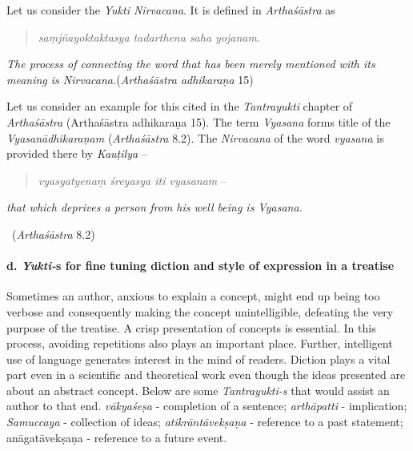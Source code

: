 Let us consider the \textit{Yukti Nirvacana}. It is defined in \textit{Arthaśāstra} as

\begin{quote}
\textit{saṃjñayoktaktasya tadarthena saha yojanam}.
\end{quote}

\begin{myquote}
\textit{The process of connecting the word that has been merely mentioned with its meaning is Nirvacana.}\hfill (\textit{Arthaśāstra adhikaraṇa} 15)
\end{myquote}

Let us consider an example for this cited in the \textit{Tantrayukti} chapter of \textit{Arthaśāstra} (Arthaśāstra adhikaraṇa 15). The term \textit{Vyasana} forms title of the \textit{Vyasanādhikaraṇam} (\textit{Arthaśāstra} 8.2). The \textit{Nirvacana} of the word \textit{vyasana} is provided there by \textit{Kauṭilya} –

\begin{verse}
\textit{vyasyatyenaṃ śreyasya iti vyasanam} –
\end{verse}

\begin{myquote}
\textit{that which deprives a person from his well being is Vyasana.}

~\hfill (\textit{Arthaśāstra} 8.2)
\end{myquote}


\paragraph*{d. \textit{Yukti-}s for fine tuning diction and style of expression in a treatise}

Sometimes an author, anxious to explain a concept, might end up being too verbose and consequently making the concept unintelligible, defeating the very purpose of the treatise. A crisp presentation of concepts is essential. In this process, avoiding repetitions also plays an important place. Further, intelligent use of language generates interest in the mind of readers. Diction plays a vital part even in a scientific and theoretical work even though the ideas presented are about an abstract concept. Below are some \textit{Tantrayukti-s} that would assist an author to that end. \textit{vākyaśeṣa} - completion of a sentence; \textit{arthāpatti} - implication; \textit{Samuccaya} - collection of ideas; \textit{atikrāntāvekṣaṇa} - reference to a past statement; anāgatāvekṣaṇa - reference to a future event.

